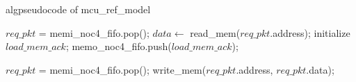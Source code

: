 \documentclass{article}
\begin{document}
\begin{algorithm}
\caption{algpseudocode of mcu\_ref\_model}
\begin{algorithmic}[1]
				\State $req\_pkt$ = memi\_noc4\_fifo.pop();
				\State $data \leftarrow$ read\_mem($req\_pkt$.address);
				\State initialize $load\_mem\_ack$;
				\State memo\_noc4\_fifo.push($load\_mem\_ack$);
				
				\State $req\_pkt$ = memi\_noc4\_fifo.pop();
				\State write\_mem($req\_pkt$.address, $req\_pkt$.data);				
				
			\EndIf
		\EndIf
	\EndWhile
\end{algorithmic}
\end{algorithm}
\end{document}
